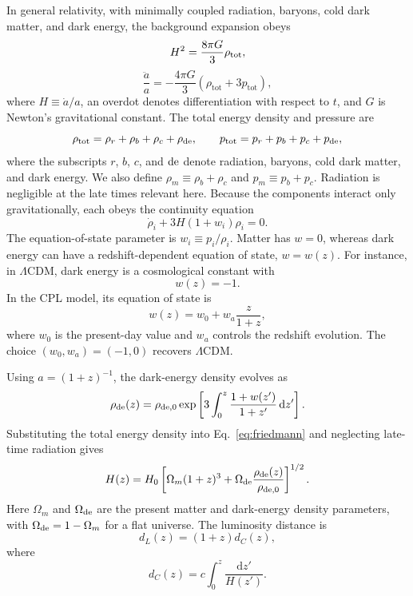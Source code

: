 \documentclass[
  aps,
  prd,
  twocolumn,
  nofootinbib,
  superscriptaddress,
  floatfix,
  longbibliography
]{revtex4-2}
\newcommand{\dd}{\mathrm{d}}
\newcommand{\LCDM}{\ensuremath{\Lambda\mathrm{CDM}}}
\begin{document}
In general relativity, with minimally coupled radiation, baryons, cold
dark matter, and dark energy, the background expansion obeys
\begin{equation}
H^2 = \frac{8\pi G}{3}\rho_{\rm tot},
\label{eq:friedmann}
\end{equation}
\begin{equation}
\frac{\ddot{a}}{a}=-\frac{4 \pi G}{3}\left(\rho_{\mathrm{tot}}+3 p_{\mathrm{tot}}\right),
\end{equation}
where $H\equiv \dot a/a$, an overdot denotes differentiation with respect
to $t$, and $G$ is Newton's gravitational constant. The total energy
density and pressure are
\begin{equation}
\rho_{\rm tot}=\rho_r+\rho_b+\rho_c+\rho_{\rm de}, \qquad p_{\rm tot}=p_r+p_b+p_c+p_{\rm de},
\end{equation}
where the subscripts $r$, $b$, $c$, and ${\rm de}$ denote radiation,
baryons, cold dark matter, and dark energy. We also define
$\rho_m\equiv\rho_b+\rho_c$ and $p_m\equiv p_b+p_c$. Radiation is
negligible at the late times relevant here. Because the components interact
only gravitationally, each obeys the continuity equation
\begin{equation}
\dot\rho_i + 3H\left(1+w_i\right)\rho_i = 0.
\end{equation}
The equation-of-state parameter is $w_i\equiv p_i/\rho_i$. Matter has
$w=0$, whereas dark energy can have a redshift-dependent equation of
state, $w=w(z)$. For instance, in $\LCDM$, dark energy is a cosmological
constant with
\begin{equation}
w(z)=-1.
\end{equation}
In the CPL model, its equation of state is~\cite{Chevallier2001,Linder2003}
\begin{equation}
w(z)=w_0+w_a\frac{z}{1+z},
\end{equation}
where $w_0$ is the present-day value and $w_a$ controls the redshift
evolution. The choice $(w_0,w_a)=(-1,0)$ recovers $\LCDM$.

Using $a=(1+z)^{-1}$, the dark-energy density evolves as
\begin{equation}
\rho_{\rm de}(z)=\rho_{{\rm de},0}\exp\left[3\int_0^z \frac{1 + w(z')}{1+z'}\,\dd z'\right].
\label{eq:rho_de_evolution}
\end{equation}
Substituting the total energy density into Eq.~\eqref{eq:friedmann} and
neglecting late-time radiation gives
\begin{equation}
H(z)=H_0\left[\Omega_m(1+z)^3
+\Omega_{\rm de}\frac{\rho_{\rm de}(z)}{\rho_{{\rm de},0}}\right]^{1/2}.
\label{eq:Hz_from_components}
\end{equation}
Here $\Omega_m$ and $\Omega_{\rm de}$ are the present matter and
dark-energy density parameters, with $\Omega_{\rm de}=1-\Omega_m$ for a
flat universe. The luminosity distance is
\begin{equation}
d_L(z)=(1+z)d_C(z),
\label{eq:dl_from_H}
\end{equation}
where
\begin{equation}
d_C(z)=c\int_0^z \frac{\dd z'}{H(z')}.
\label{eq:dc_from_H}
\end{equation}
\end{document}
